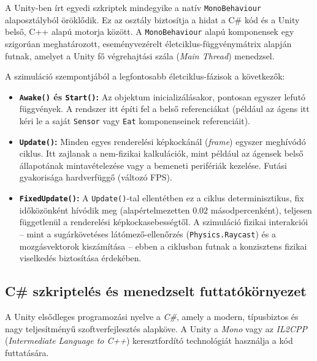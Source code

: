A Unity-ben írt egyedi szkriptek mindegyike a natív \texttt{MonoBehaviour} alaposztályból öröklődik. Ez az osztály biztosítja a hidat a C\# kód és a Unity belső, C++ alapú motorja között. A \texttt{MonoBehaviour} alapú komponensek egy szigorúan meghatározott, eseményvezérelt életciklus-függvénymátrix alapján futnak, amelyet a Unity fő végrehajtási szála (\textit{Main Thread}) menedzsel.

A szimuláció szempontjából a legfontosabb életciklus-fázisok a következők:
\begin{itemize}
    \item \textbf{\texttt{Awake()} és \texttt{Start()}:} Az objektum inicializálásakor, pontosan egyszer lefutó függvények. A rendszer itt építi fel a belső referenciákat (például az ágens itt kéri le a saját \texttt{Sensor} vagy \texttt{Eat} komponenseinek referenciáit).
    \item \textbf{\texttt{Update()}:} Minden egyes renderelési képkockánál (\textit{frame}) egyszer meghívódó ciklus. Itt zajlanak a nem-fizikai kalkulációk, mint például az ágensek belső állapotának mintavételezése vagy a bemeneti perifériák kezelése. Futási gyakorisága hardverfüggő (változó FPS).
    \item \textbf{\texttt{FixedUpdate()}:} A \texttt{Update()}-tal ellentétben ez a ciklus determinisztikus, fix időközönként hívódik meg (alapértelmezetten $0.02$ másodpercenként), teljesen függetlenül a renderelési képkockasebességtől. A szimuláció fizikai interakciói – mint a sugárkövetéses látómező-ellenőrzés (\texttt{Physics.Raycast}) és a mozgásvektorok kiszámítása – ebben a ciklusban futnak a konzisztens fizikai viselkedés biztosítása érdekében.
\end{itemize}

\subsection{C\# szkriptelés és menedzselt futtatókörnyezet}

A Unity elsődleges programozási nyelve a \textit{C\#}, amely a modern, típusbiztos és nagy teljesítményű szoftverfejlesztés alapköve. A Unity a \textit{Mono} vagy az \textit{IL2CPP} (\textit{Intermediate Language to C++}) keresztfordító technológiát használja a kód futtatására. 

